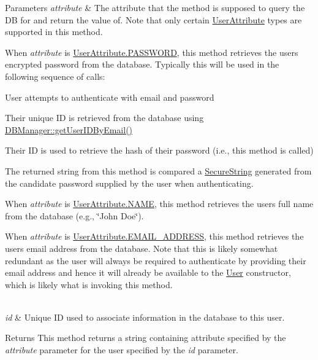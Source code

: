 \begin{DoxyParams}{Parameters}
{\em attribute} & The attribute that the method is supposed to query the DB for and return the value of. Note that only certain \mbox{\hyperlink{enumcom_1_1activitytracker_1_1_user_attribute}{User\+Attribute}} types are supported in this method.
\begin{DoxyItemize}
\item When {\itshape attribute} is \mbox{\hyperlink{enumcom_1_1activitytracker_1_1_user_attribute_aa893eac0362a28e73a599ce1ba141d40}{User\+Attribute.\+P\+A\+S\+S\+W\+O\+RD}}, this method retrieves the user\textquotesingle{}s encrypted password from the database. Typically this will be used in the following sequence of calls\+:
\begin{DoxyEnumerate}
\item User attempts to authenticate with email and password
\item Their unique ID is retrieved from the database using \mbox{\hyperlink{classcom_1_1activitytracker_1_1_d_b_manager_a195dcdeabdd00facb19d720976dd3f53}{D\+B\+Manager\+::get\+User\+I\+D\+By\+Email()}}
\item Their ID is used to retrieve the hash of their password (i.\+e., this method is called)
\item The returned string from this method is compared a \mbox{\hyperlink{classcom_1_1activitytracker_1_1_secure_string}{Secure\+String}} generated from the candidate password supplied by the user when authenticating.
\end{DoxyEnumerate}
\item When {\itshape attribute} is \mbox{\hyperlink{enumcom_1_1activitytracker_1_1_user_attribute_aac51a5dfcaaa9e5304d37d74fc888af4}{User\+Attribute.\+N\+A\+ME}}, this method retrieves the user\textquotesingle{}s full name from the database (e.\+g., \char`\"{}\+John Doe\char`\"{}).
\item When {\itshape attribute} is \mbox{\hyperlink{enumcom_1_1activitytracker_1_1_user_attribute_a8b9fa2ebf911262dfa24c683ff2a3b9c}{User\+Attribute.\+E\+M\+A\+I\+L\+\_\+\+A\+D\+D\+R\+E\+SS}}, this method retrieves the user\textquotesingle{}s email address from the database. Note that this is likely somewhat redundant as the user will always be required to authenticate by providing their email address and hence it will already be available to the \mbox{\hyperlink{classcom_1_1activitytracker_1_1_user}{User}} constructor, which is likely what is invoking this method. 
\end{DoxyItemize}\\
\hline
{\em id} & Unique ID used to associate information in the database to this user.\\
\hline
\end{DoxyParams}
\begin{DoxyReturn}{Returns}
This method returns a string containing attribute specified by the {\itshape attribute} parameter for the user specified by the {\itshape id} parameter. 
\end{DoxyReturn}


